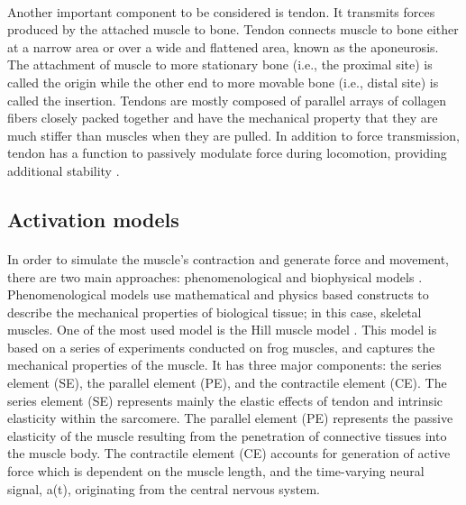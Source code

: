 \paragraph{}Another important component to be considered is tendon. It transmits forces produced by the attached muscle to bone. Tendon connects muscle to bone either at a narrow area or over a wide and flattened area, known as the aponeurosis. The attachment of muscle to more stationary bone (i.e., the proximal site) is called the origin while the other end to more movable bone (i.e., distal site) is called the insertion. Tendons are mostly composed of parallel arrays of collagen fibers closely packed together and have the mechanical property that they are much stiffer than muscles when they are pulled. In addition to force transmission, tendon has a function to passively modulate force during locomotion, providing additional stability \citep{oatis2009kynesiology, lee2010survey}. 


\subsection{Activation models}

\paragraph{}In order to simulate the muscle's contraction and generate force and movement, there are two main approaches: phenomenological and biophysical models \citep{tang20093d, rohrle2012physiologically}. Phenomenological models use mathematical and physics based constructs to describe the mechanical properties of biological tissue; in this case, skeletal muscles. One of the most used model is the Hill muscle model \citep{hill1970first}. This model is based on a series of experiments conducted on frog muscles, and captures the mechanical properties of the muscle. It has three major components: the series element (SE), the parallel element (PE), and the contractile element (CE). The series element (SE) represents mainly the elastic effects of tendon and intrinsic elasticity within the sarcomere. The parallel element (PE) represents the passive elasticity of the muscle resulting from the penetration of connective tissues into the muscle body. The contractile element (CE) accounts for generation of active force which is dependent on the muscle length, and the time-varying neural signal, a(t), originating from the central nervous system.

